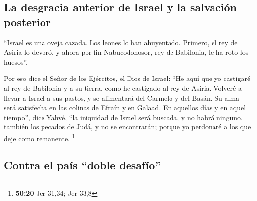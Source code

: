 \begin{paracol}{2}
\hypertarget{la-desgracia-anterior-de-israel-y-la-salvaciuxf3n-posterior}{%
\subsection{La desgracia anterior de Israel y la salvación
posterior}\label{la-desgracia-anterior-de-israel-y-la-salvaciuxf3n-posterior}}

 ``Israel es una oveja cazada. Los leones lo han
ahuyentado. Primero, el rey de Asiria lo devoró, y ahora por fin
Nabucodonosor, rey de Babilonia, le ha roto los huesos''.

 Por eso dice el Señor de los Ejércitos, el Dios de
Israel: ``He aquí que yo castigaré al rey de Babilonia y a su tierra,
como he castigado al rey de Asiria.  Volveré a llevar a
Israel a sus pastos, y se alimentará del Carmelo y del Basán. Su alma
será satisfecha en las colinas de Efraín y en Galaad.  En
aquellos días y en aquel tiempo'', dice Yahvé, ``la iniquidad de Israel
será buscada, y no habrá ninguno, también los pecados de Judá, y no se
encontrarán; porque yo perdonaré a los que deje como remanente.
\footnote{\textbf{50:20} Jer 31,34; Jer 33,8}

\hypertarget{contra-el-pauxeds-doble-desafuxedo}{%
\subsection{Contra el país ``doble
desafío''}\label{contra-el-pauxeds-doble-desafuxedo}}


\end{paracol}
